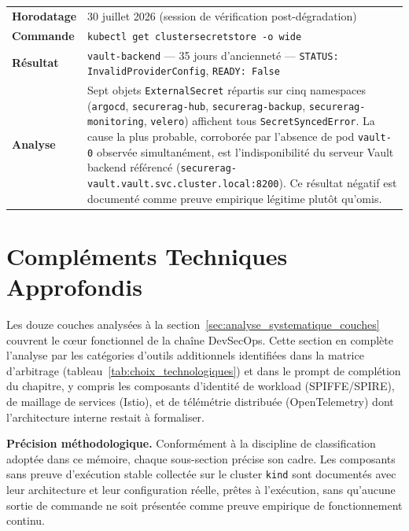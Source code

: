 \begin{tcolorbox}[colback=LightGray, colframe=orange!70!black,
    title={\small\bfseries Preuve \#15 — ClusterSecretStore ESO en échec (\texttt{InvalidProviderConfig})}]
\footnotesize
\begin{tabular}{@{}p{3cm}p{10cm}@{}}
\textbf{Horodatage} & 30 juillet 2026 (session de vérification post-dégradation) \\
\textbf{Commande} & \texttt{kubectl get clustersecretstore -o wide} \\
\textbf{Résultat} & \texttt{vault-backend} — 35 jours d'ancienneté — \texttt{STATUS: InvalidProviderConfig}, \texttt{READY: False} \\
\textbf{Analyse} & Sept objets \texttt{ExternalSecret} répartis sur cinq namespaces (\texttt{argocd}, \texttt{securerag-hub}, \texttt{securerag-backup}, \texttt{securerag-monitoring}, \texttt{velero}) affichent tous \texttt{SecretSyncedError}. La cause la plus probable, corroborée par l'absence de pod \texttt{vault-0} observée simultanément, est l'indisponibilité du serveur Vault backend référencé (\texttt{securerag-vault.vault.svc.cluster.local:8200}). Ce résultat négatif est documenté comme preuve empirique légitime plutôt qu'omis. \\
\end{tabular}
\end{tcolorbox}


\section{Compléments Techniques Approfondis}
\label{sec:complements_techniques}

Les douze couches analysées à la section~\ref{sec:analyse_systematique_couches} couvrent le cœur fonctionnel de la chaîne DevSecOps. Cette section en complète l'analyse par les catégories d'outils additionnels identifiées dans la matrice d'arbitrage (tableau~\ref{tab:choix_technologiques}) et dans le prompt de complétion du chapitre, y compris les composants d'identité de workload (SPIFFE/SPIRE), de maillage de services (Istio), et de télémétrie distribuée (OpenTelemetry) dont l'architecture interne restait à formaliser.

\textbf{Précision méthodologique.} Conformément à la discipline de classification adoptée dans ce mémoire, chaque sous-section précise son cadre. Les composants sans preuve d'exécution stable collectée sur le cluster \texttt{kind} sont documentés avec leur architecture et leur configuration réelle, prêtes à l'exécution, sans qu'aucune sortie de commande ne soit présentée comme preuve empirique de fonctionnement continu.


